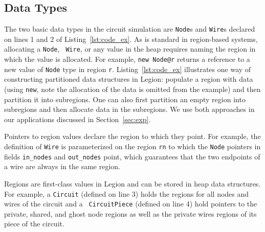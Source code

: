 \subsection{Data Types}
\label{subsec:datatypes}
The two basic data types in the circuit simulation are {\tt Node}s and
{\tt Wire}s declared on lines 1 and 2 of Listing~\ref{lst:code_ex}.
As is standard in region-based systems, allocating a {\tt Node}, {\tt
  Wire}, or any value in the heap requires naming the region
in which the value is allocated.  For example, {\tt new Node@r} returns
a reference to a new value of {\tt Node} type in region {\tt r}.  
Listing~\ref{lst:code_ex} illustrates one way of constructing partitioned
data structures in Legion: populate a region with data (using {\tt new}, note the allocation
of the data is omitted from the example) and then partition it
into subregions.  One can also first partition an empty region into subregions
and then allocate data in the subregions. We use both approaches in our
applications discussed in Section~\ref{sec:exp}.

Pointers to region values declare the region to which they point.  For
example, the definition of {\tt Wire} is parameterized on the region
{\tt rn} to which the {\tt Node} pointers in fields {\tt in\_nodes}
and {\tt out\_nodes} point, which guarantees that the two endpoints of
a wire are always in the same region.

Regions are first-class values in Legion and can be stored in heap
data structures.  For example, a {\tt Circuit} (defined on line 3)
holds the regions for all nodes and wires of the circuit and a {\tt
  CircuitPiece} (defined on line 4) hold pointers to the private,
shared, and ghost node regions as well as the private wires regions of its piece of
the circuit.





%

%
%
